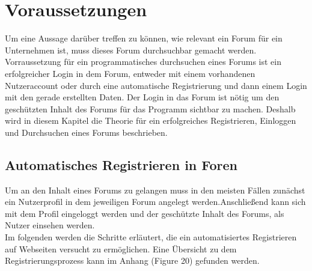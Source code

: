 \section{Voraussetzungen}
Um eine Aussage darüber treffen zu können, wie relevant ein Forum für ein Unternehmen ist, muss dieses Forum durchsuchbar gemacht werden.
Vorraussetzung für ein programmatisches durchsuchen eines Forums ist ein erfolgreicher Login in dem Forum, entweder mit einem vorhandenen Nutzeraccount oder durch eine automatische Registrierung und dann einem Login mit den gerade erstellten Daten.
Der Login in das Forum ist nötig um den geschützten Inhalt des Forums für das Programm sichtbar zu machen. Deshalb wird in diesem Kapitel die Theorie für ein erfolgreiches Registrieren, Einloggen und Durchsuchen eines Forums beschrieben.

\subsection {Automatisches Registrieren in Foren}
Um an den Inhalt eines Forums zu gelangen muss in den meisten Fällen zunächst ein Nutzerprofil in dem jeweiligen Forum angelegt werden.Anschließend kann sich mit dem Profil eingeloggt werden und der geschützte Inhalt des Forums, als Nutzer einsehen werden. \\
Im folgenden werden die Schritte erläutert, die ein automatisiertes Registrieren auf Webseiten versucht zu ermöglichen.
Eine Übersicht zu dem Registrierungsprozess kann im Anhang (Figure 20) gefunden werden.

